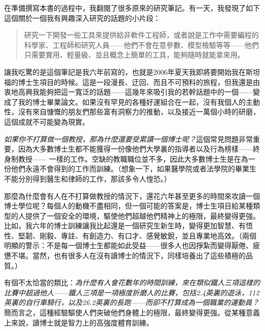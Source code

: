 \documentclass[12pt,UTF8,nofonts]{book}
\begin{document}
\breakline

在準備撰寫本書的過程中，我翻閱了很多原來的研究筆記。有一天，我發現了如下這個關於一個我有興趣深入研究的話題的小片段：
\begin{quote}
  研究一下開發一些工具來提供給非軟件工程師，或者說是工作中需要編程的科學家、工程師和研究人員——他們不會在意參數、模型檢驗等等——他們只需要實用、輕量級、並且概念上簡單的工具，能夠隨時就能拿來用。
\end{quote}
讓我吃驚的是這個筆記是我六年前寫的，也就是2006年夏天我即將要開始我在斯坦福的博士生項目的時候。這是一段漫長、迂回、而且不可預料的旅程，但我還是由衷地高興我能夠把這一寬泛的話題——這幾年來吸引我的若幹話題中的一個——變成了我的博士畢業論文。如果沒有罕見的各種好運組合在一起，沒有我個人的主動性，沒有來自慷慨的朋友們那些富有洞察力的推動，以及接近一萬個小時的研磨，這個成就不可能變為現實。

\emph{如果你不打算做一個教授，那為什麼還要受累讀一個博士呢？}這個常見問題非常重要，因為大多數博士生都不能獲得一份像他們大學裏的指導者以及行為榜樣——終身制教授—— 一樣的工作。空缺的教職職位並不多，因此大多數博士生是在為一份他們永遠不會得到的工作而訓練。（想象一下，如果醫學院或者法學院的畢業生不能分別得到醫生和律師的工作，那該多令人惶恐。）

那麼為什麼會有人在不打算做教授的情況下，還花六年甚至更多的時間來攻讀一個博士學位呢？每個人的動機不盡相同，但一個可能的答案是，博士生項目給某種類型的人提供了一個安全的環境，驅使他們超越他們精神上的極限，最終變得更強。比如，我六年的博士訓練讓我比起還是一個研究生新生時，變得更加智慧、有悟性、堅韌、剛毅、專註、有創造力、有口才、感覺敏銳，並且專業地高效。（兩個明顯的警示：不是每一個博士生都能如此受益——很多人也因掙紮而變得厭倦、疲憊不堪。當然，也有很多人在沒有讀博士的情況下，同樣培養出了這些積極的品質。）

有個不太恰當的類比：\emph{為什麼有人會花數年的時間訓練，來在類似鐵人三項這樣的比賽中超過他人——鐵人三項是一項極度折磨人的比賽，包括2.4英裏的遊泳，112英裏的自行車騎行，以及26.2英裏的長跑——而卻不打算成為一個職業的運動員？}簡而言之，這種經驗驅使人們突破他們身體上的極限，最終變得更強。從某種意義上來說，讀博士就是智力上的高強度體育訓練。

\breakline
\end{document}
